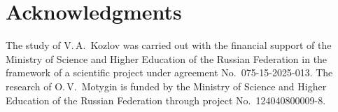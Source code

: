 \documentclass[oneside,a4paper,11pt]{article}
\theoremstyle{thmstyletwo}%
\theoremstyle{thmstylethree}%
\numberwithin{equation}{section}
\begin{document}
\section*{Acknowledgments}

\noindent The study of V.\,A.~Kozlov was carried out with the financial support of the Ministry of Science and Higher Education of the Russian Federation in the framework of a scientific project under agreement No.~075-15-2025-013.
The research of O.\,V.~Motygin is funded by the Ministry of Science and Higher Education of the Russian Federation through project No.~124040800009-8.

\printbibliography
\end{document}
